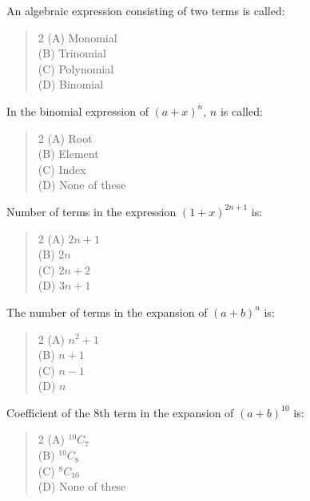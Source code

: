 \documentclass[11pt,a4paper]{article}
\begin{document}
\begin{mcqlist}
\item An algebraic expression consisting of two terms is called:
\begin{quote}\begin{multicols}{2}
\noindent (A) Monomial \\
(B) Trinomial \\
(C) Polynomial \\
(D) Binomial
\end{multicols}\end{quote}

\item In the binomial expression of $(a+x)^n$, $n$ is called:
\begin{quote}\begin{multicols}{2}
\noindent (A) Root \\
(B) Element \\
(C) Index \\
(D) None of these
\end{multicols}\end{quote}

\item Number of terms in the expression $(1+x)^{2n+1}$ is:
\begin{quote}\begin{multicols}{2}
\noindent (A) $2n+1$ \\
(B) $2n$ \\
(C) $2n+2$ \\
(D) $3n+1$
\end{multicols}\end{quote}

\item The number of terms in the expansion of $(a+b)^n$ is:
\begin{quote}\begin{multicols}{2}
\noindent (A) $n^2+1$ \\
(B) $n+1$ \\
(C) $n-1$ \\
(D) $n$
\end{multicols}\end{quote}

\item Coefficient of the 8th term in the expansion of $(a+b)^{10}$ is:
\begin{quote}\begin{multicols}{2}
\noindent (A) $^{10}C_7$ \\
(B) $^{10}C_8$ \\
(C) $^8C_{10}$ \\
(D) None of these
\end{multicols}\end{quote}


\end{mcqlist}
\end{document}

